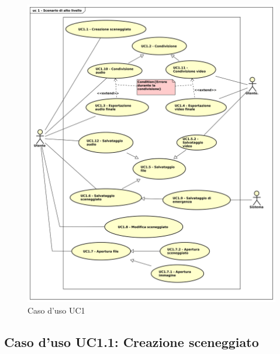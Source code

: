\begin{figure}[H]
\centering
\includegraphics[scale=0.5]{immagini/uc1_scenario_alto_livello.png}
\captionsetup{labelfont=bf}
\caption{Caso d'uso UC1}
\end{figure}
\newpage


\subsection{Caso d'uso UC1.1: Creazione sceneggiato}
\label{sec:UC1.1}


